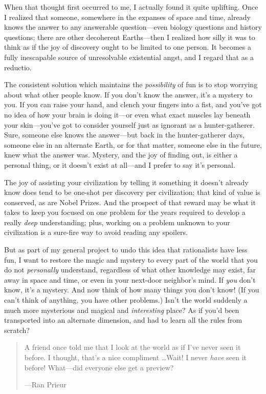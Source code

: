 {
 When that thought first occurred to me, I actually found it quite
uplifting. Once I realized that someone, somewhere in the expanses of
space and time, already knows the answer to any answerable
question---even biology questions and history questions; there are
other decoherent Earths---then I realized how silly it was to think as
if the joy of discovery ought to be limited to one person. It becomes a
fully inescapable source of unresolvable existential angst, and I
regard that as a reductio.}

{
 The consistent solution which maintains the \textit{possibility}
of fun is to stop worrying about what other people know. If you
don't know the answer, it's a mystery
to you. If you can raise your hand, and clench your fingers into a
fist, and you've got no idea of how your brain is doing
it---or even what exact muscles lay beneath your
skin---you've got to consider yourself just as ignorant
as a hunter-gatherer. Sure, someone else knows the answer---but back in
the hunter-gatherer days, someone else in an alternate Earth, or for
that matter, someone else in the future, knew what the answer was.
Mystery, and the joy of finding out, is either a personal thing, or it
doesn't exist at all---and I prefer to say
it's personal.}

{
 The joy of assisting your civilization by telling it something it
doesn't already know does tend to be one-shot per
discovery per civilization; that kind of value is conserved, as are
Nobel Prizes. And the prospect of that reward may be what it takes to
keep you focused on one problem for the years required to develop a
really \textit{deep} understanding; plus, working on a problem unknown
to your civilization is a sure-fire way to avoid reading any spoilers.}

{
 But as part of my general project to undo this idea that
rationalists have less fun, I want to restore the magic and mystery to
every part of the world that you do not \textit{personally} understand,
regardless of what other knowledge may exist, far away in space and
time, or even in your next-door neighbor's mind. If
\textit{you} don't know, it's a
mystery. And now think of how many things you don't
know! (If you can't think of anything, you have other
problems.) Isn't the world suddenly a much more
mysterious and magical and \textit{interesting} place? As if
you'd been transported into an alternate dimension, and
had to learn all the rules from scratch?}

\begin{quote}
{
 A friend once told me that I look at the world as if
I've never seen it before. I thought,
that's a nice compliment \ldots Wait! I never
\textit{have} seen it before! What---did everyone else get a preview?}

{\raggedleft
 {}---Ran Prieur
\par}
\end{quote}

